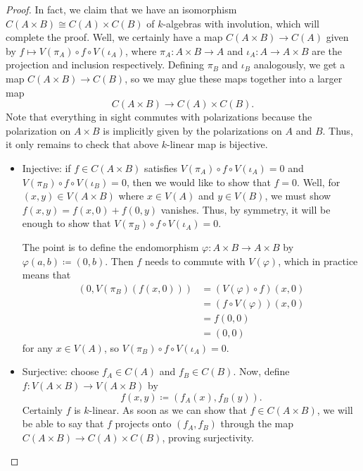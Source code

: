 \documentclass{article}
\begin{document}
\begin{proof}
	In fact, we claim that we have an isomorphism $C(A\times B)\cong C(A)\times C(B)$ of $k$-algebras with involution, which will complete the proof. Well, we certainly have a map $C(A\times B)\to C(A)$ given by $f\mapsto V(\pi_A)\circ f\circ V(\iota_A)$, where $\pi_A\colon A\times B\to A$ and $\iota_A\colon A\to A\times B$ are the projection and inclusion respectively. Defining $\pi_B$ and $\iota_B$ analogously, we get a map $C(A\times B)\to C(B)$, so we may glue these maps together into a larger map
	\[C(A\times B)\to C(A)\times C(B).\]
	Note that everything in sight commutes with polarizations because the polarization on $A\times B$ is implicitly given by the polarizations on $A$ and $B$. Thus, it only remains to check that above $k$-linear map is bijective.
	\begin{itemize}
		\item Injective: if $f\in C(A\times B)$ satisfies $V(\pi_A)\circ f\circ V(\iota_A)=0$ and $V(\pi_B)\circ f\circ V(\iota_B)=0$, then we would like to show that $f=0$. Well, for $(x,y)\in V(A\times B)$ where $x\in V(A)$ and $y\in V(B)$, we must show $f(x,y)=f(x,0)+f(0,y)$ vanishes. Thus, by symmetry, it will be enough to show that $V(\pi_B)\circ f\circ V(\iota_A)=0$.

		The point is to define the endomorphism $\varphi\colon A\times B\to A\times B$ by $\varphi(a,b)\coloneqq(0,b)$. Then $f$ needs to commute with $V(\varphi)$, which in practice means that
		\begin{align*}
			(0,V(\pi_B)(f(x,0))) &= (V(\varphi)\circ f)(x,0) \\
			&= (f\circ V(\varphi))(x,0) \\
			&= f(0,0) \\
			&= (0,0)
		\end{align*}
		for any $x\in V(A)$, so $V(\pi_B)\circ f\circ V(\iota_A)=0$.

		\item Surjective: choose $f_A\in C(A)$ and $f_B\in C(B)$. Now, define $f\colon V(A\times B)\to V(A\times B)$ by
		\[f(x,y)\coloneqq(f_A(x),f_B(y)).\]
		Certainly $f$ is $k$-linear. As soon as we can show that $f\in C(A\times B)$, we will be able to say that $f$ projects onto $(f_A,f_B)$ through the map $C(A\times B)\to C(A)\times C(B)$, proving surjectivity.


\end{itemize}
\end{proof}
\end{document}

